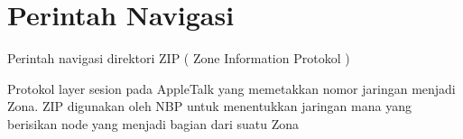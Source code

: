 \section{Perintah Navigasi}
Perintah navigasi direktori
ZIP ( Zone Information Protokol )

Protokol layer sesion pada AppleTalk yang memetakkan nomor jaringan menjadi Zona. ZIP digunakan oleh NBP untuk menentukkan jaringan mana yang berisikan node yang menjadi bagian dari suatu Zona 